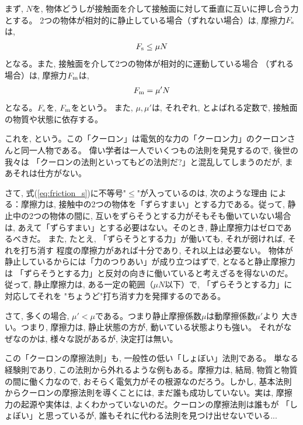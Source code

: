 まず, $N$を, 物体どうしが接触面を介して接触面に対して垂直に互いに押し合う力とする。
2つの物体が相対的に静止している場合（ずれない場合）は, 摩擦力$F_{\text s}$は, 
\begin{eqnarray}
F_{\text s} \leq \mu N\label{eq:friction_s}
\end{eqnarray}
となる。また, 接触面を介して2つの物体が相対的に運動している場合
（ずれる場合）は, 摩擦力$F_{\text m}$は, 
\begin{eqnarray}
F_{\text m}=\mu' N\label{eq:friction_m}
\end{eqnarray}
となる。$F_{\text s}$を, 
$F_{\text m}$をという。
また, $\mu, \mu'$は, それぞれ, 
とよばれる定数で, 接触面の物質や状態に依存する。

これを, 
という。この「クーロン」は電気的な力の「クーロン力」のクーロンさんと同一人物である。
偉い学者は一人でいくつもの法則を発見するので, 後世の我々は
「クーロンの法則といってもどの法則だ?」と混乱してしまうのだが, まあそれは仕方がない。

さて, 式(\ref{eq:friction_s})に不等号"$\leq$"が入っているのは, 次のような理由
による：摩擦力は, 接触中の2つの物体を「ずらすまい」とする力である。従って, 
静止中の2つの物体の間に, 互いをずらそうとする力がそもそも働いていない場合は, 
あえて「ずらすまい」とする必要はない。そのとき, 静止摩擦力はゼロであるべきだ。
また, たとえ, 「ずらそうとする力」が働いても, それが弱ければ, それを打ち消す
程度の摩擦力があれば十分であり, それ以上は必要ない。
物体が静止しているからには「力のつりあい」が成り立つはずで, となると静止摩擦力は
「ずらそうとする力」と反対の向きに働いていると考えざるを得ないのだ。
従って, 静止摩擦力は, 
ある一定の範囲（$\mu N$以下）で, 「ずらそうとする力」に対応してそれを
"ちょうど"打ち消す力を発揮するのである。

さて, 多くの場合, $\mu'<\mu$である。つまり静止摩擦係数$\mu$は動摩擦係数$\mu'$より
大きい。つまり, 摩擦力は, 静止状態の方が, 動いている状態よりも強い。
それがなぜなのかは, 様々な説があるが, 決定打は無い。

この「クーロンの摩擦法則」も, 一般性の低い「しょぼい」法則である。
単なる経験則であり, この法則から外れるような例もある。摩擦力は, 結局, 
物質と物質の間に働く力なので, おそらく電気力がその根源なのだろう。しかし, 
基本法則からクーロンの摩擦法則を導くことには, まだ誰も成功していない。実は, 
摩擦力の起源や実体は, よくわかっていないのだ。クーロンの摩擦法則は誰もが
「しょぼい」と思っているが, 誰もそれに代わる法則を見つけ出せないでいる...\mv

